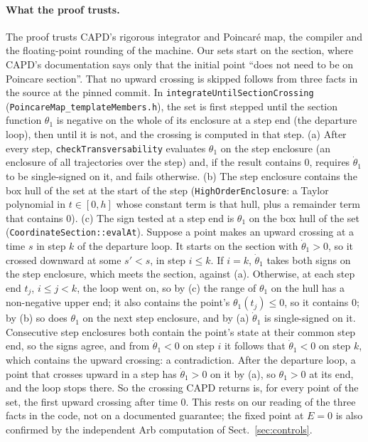 \documentclass[11pt]{article}
\theoremstyle{definition}
\begin{document}
\paragraph{What the proof trusts.} The proof trusts CAPD's rigorous integrator and Poincar\'e map, the compiler and the floating-point rounding of the machine. Our sets start on the section, where CAPD's documentation says only that the initial point ``does not need to be on Poincare section''. That no upward crossing is skipped follows from three facts in the source at the pinned commit. In \texttt{integrateUntilSectionCrossing} (\texttt{PoincareMap\_templateMembers.h}), the set is first stepped until the section function $\theta_1$ is negative on the whole of its enclosure at a step end (the departure loop), then until it is not, and the crossing is computed in that step. (a) After every step, \texttt{checkTransversability} evaluates $\theta_1$ on the step enclosure (an enclosure of all trajectories over the step) and, if the result contains $0$, requires $\dot\theta_1$ to be single-signed on it, and fails otherwise. (b) The step enclosure contains the box hull of the set at the start of the step (\texttt{HighOrderEnclosure}: a Taylor polynomial in $t \in [0, h]$ whose constant term is that hull, plus a remainder term that contains $0$). (c) The sign tested at a step end is $\theta_1$ on the box hull of the set (\texttt{CoordinateSection::evalAt}). Suppose a point makes an upward crossing at a time $s$ in step $k$ of the departure loop. It starts on the section with $\dot\theta_1 > 0$, so it crossed downward at some $s' < s$, in step $i \le k$. If $i = k$, $\dot\theta_1$ takes both signs on the step enclosure, which meets the section, against (a). Otherwise, at each step end $t_j$, $i \le j < k$, the loop went on, so by (c) the range of $\theta_1$ on the hull has a non-negative upper end; it also contains the point's $\theta_1(t_j) \le 0$, so it contains $0$; by (b) so does $\theta_1$ on the next step enclosure, and by (a) $\dot\theta_1$ is single-signed on it. Consecutive step enclosures both contain the point's state at their common step end, so the signs agree, and from $\dot\theta_1 < 0$ on step $i$ it follows that $\dot\theta_1 < 0$ on step $k$, which contains the upward crossing: a contradiction. After the departure loop, a point that crosses upward in a step has $\dot\theta_1 > 0$ on it by (a), so $\theta_1 > 0$ at its end, and the loop stops there. So the crossing CAPD returns is, for every point of the set, the first upward crossing after time $0$. This rests on our reading of the three facts in the code, not on a documented guarantee; the fixed point at $E = 0$ is also confirmed by the independent Arb computation of Sect.~\ref{sec:controls}.
\end{document}

